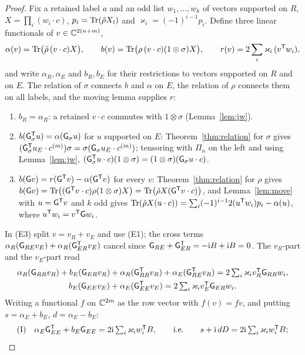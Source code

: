 \begin{proof}
Fix a retained label $a$ and an odd list $w_1,\ldots,w_k$ of vectors supported on $R$,
$X=\prod_i(w_i\cdot c)$, $p_i=\operatorname{Tr}(\tilde\rho X_{\hat\imath})$ and $\varkappa_i=(-1)^{i-1}p_i$. Define three
linear functionals of $v\in\mathbb C^{2(n+m)}$,
\[
 \alpha(v)=\operatorname{Tr}\bigl(\tilde\rho\,(v\cdot c)X\bigr),\qquad
 b(v)=\operatorname{Tr}\bigl(\rho\,(v\cdot c)(1\otimes\sigma)X\bigr),\qquad
 r(v)=2\sum_i\varkappa_i\,(v^{\mathsf T}w_i),
\]
and write $\alpha_R,\alpha_E$ and $b_R,b_E$ for their restrictions to vectors supported on $R$
and on $E$. The relation of $\sigma$ connects $b$ and $\alpha$ on $E$, the relation of $\rho$
connects them on all labels, and the moving lemma supplies $r$:
\begin{enumerate}
\item[(E1)] $b_R=\alpha_R$: a retained $v\cdot c$ commutes with $1\otimes\sigma$ (Lemma~\ref{lem:jw}).
\item[(E2)] $b(\mathsf G_\sigma^{\mathsf T}u)=\alpha(\mathsf G_\sigma u)$ for $u$ supported on $E$: Theorem~\ref{thm:relation}
for $\sigma$ gives $(\mathsf G_\sigma^{\mathsf T}u_E\cdot c^{(m)})\sigma=\sigma(\mathsf G_\sigma u_E\cdot c^{(m)})$; tensoring
with $\Pi_n$ on the left and using Lemma~\ref{lem:jw},
$(\mathsf G_\sigma^{\mathsf T}u\cdot c)(1\otimes\sigma)=(1\otimes\sigma)(\mathsf G_\sigma u\cdot c)$.
\item[(E3)] $b(\mathsf G v)=r(\mathsf G^{\mathsf T}v)-\alpha(\mathsf G^{\mathsf T}v)$ for every $v$: Theorem~\ref{thm:relation} for
$\rho$ gives $b(\mathsf G v)=\operatorname{Tr}\bigl((\mathsf G^{\mathsf T}v\cdot c)\rho(1\otimes\sigma)X\bigr)=\operatorname{Tr}\bigl(\tilde\rho X(\mathsf G^{\mathsf T}v\cdot c)\bigr)$,
and Lemma~\ref{lem:move} with $u=\mathsf G^{\mathsf T}v$ and $k$ odd gives
$\operatorname{Tr}(\tilde\rho X(u\cdot c))=\sum_i(-1)^{i-1}2(u^{\mathsf T}w_i)p_i-\alpha(u)$, where $u^{\mathsf T}w_i=v^{\mathsf T}\mathsf G w_i$.
\end{enumerate}
In (E3) split $v=v_R+v_E$ and use (E1); the cross terms
$\alpha_R(\mathsf G_{RE}v_E)+\alpha_R(\mathsf G_{ER}^{\mathsf T}v_E)$ cancel since $\mathsf G_{RE}+\mathsf G_{ER}^{\mathsf T}=-\mathrm i B+\mathrm i B=0$.
The $v_R$-part and the $v_E$-part read
\begin{gather*}
 \alpha_R(\mathsf G_{RR}v_R)+b_E(\mathsf G_{ER}v_R)+\alpha_R(\mathsf G_{RR}^{\mathsf T}v_R)+\alpha_E(\mathsf G_{RE}^{\mathsf T}v_R)=2\textstyle\sum_i\varkappa_iv_R^{\mathsf T}\mathsf G_{RR}w_i,\\
 b_E(\mathsf G_{EE}v_E)+\alpha_E(\mathsf G_{EE}^{\mathsf T}v_E)=2\textstyle\sum_i\varkappa_iv_E^{\mathsf T}\mathsf G_{ER}w_i.
\end{gather*}
Writing a functional $f$ on $\mathbb C^{2m}$ as the row vector with $f(v)=fv$, and putting
$s=\alpha_E+b_E$, $d=\alpha_E-b_E$:
\begin{align*}
 \text{(I)}\quad& \alpha_E\G_{EE}^{\T}+b_E\G_{EE}=2\ii\textstyle\sum_i\varkappa_iw_i^{\T}B,
 \qquad\text{i.e.}\qquad s+\ii\,dD=2\ii\textstyle\sum_i\varkappa_iw_i^{\T}B;\\

\end{align*}
\end{proof}
